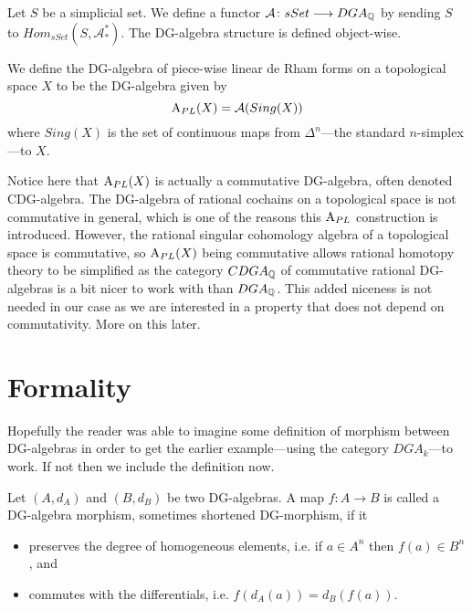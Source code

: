 \begin{definition}
Let $S$ be a simplicial set. We define a functor $\mathcal{A}\colon sSet\longrightarrow DGA_{\mathbb{Q}}$ by sending $S$ to $Hom_{sSet}(S, \mathcal{A}_*^*)$. The DG-algebra structure is defined object-wise.
\end{definition}


\begin{example}
We define the DG-algebra of piece-wise linear de Rham forms on a topological space $X$ to be the DG-algebra given by
\begin{equation*}
    \text{A}_{PL}(X) = \mathcal{A}(Sing(X))
\end{equation*}
where $Sing(X)$ is the set of continuous maps from $\Delta^n$---the standard $n$-simplex---to $X$. 
\end{example}

Notice here that $\text{A}_{PL}(X)$ is actually a commutative DG-algebra, often denoted CDG-algebra. The DG-algebra of rational cochains on a topological space is not commutative in general, which is one of the reasons this $\text{A}_{PL}$ construction is introduced. However, the rational singular cohomology algebra of a topological space is commutative, so $\text{A}_{PL}(X)$ being commutative allows rational homotopy theory to be simplified as the category $CDGA_{\mathbb{Q}}$ of commutative rational DG-algebras is a bit nicer to work with than $DGA_{\mathbb{Q}}$. This added niceness is not needed in our case as we are interested in a property that does not depend on commutativity. More on this later. 




\section{Formality}
\label{sec:formality}

Hopefully the reader was able to imagine some definition of morphism between DG-algebras in order to get the earlier example---using the category $DGA_k$---to work. If not then we include the definition now. 

\begin{definition}[DG morphism]
    Let $(A, d_A)$ and $(B, d_B)$ be two DG-algebras. A map $f:A\longrightarrow B$ is called a DG-algebra morphism, sometimes shortened DG-morphism, if it
    \begin{itemize}
        \item preserves the degree of homogeneous elements, i.e. if $a\in A^n$ then $f(a)\in B^n$, and
        \item commutes with the differentials, i.e. $f(d_A(a))=d_B(f(a))$. 
    \end{itemize}
\end{definition}

